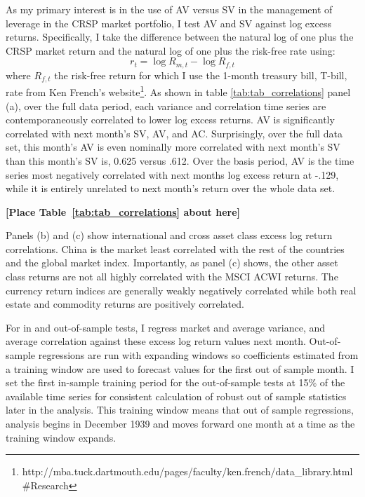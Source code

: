 As my primary interest is in the use of AV versus SV in the management of leverage in the CRSP market portfolio, I test AV and SV against log excess returns.
Specifically, I take the difference between the natural log of one plus the CRSP market return and the natural log of one plus the risk-free rate using:
\begin{equation}
	r_{t} = \log R_{m,t} - \log R_{f,t} 
\end{equation}
where $R_{f,t}$ the risk-free return for which I use the 1-month treasury bill, T-bill, rate from Ken French's website\footnote{http://mba.tuck.dartmouth.edu/pages/faculty/ken.french/data\_library.html\#Research}. As shown in table \ref{tab:tab_correlations} panel (a), over the full data period, each variance and correlation time series are contemporaneously correlated to lower log excess returns. AV is significantly correlated with next month's SV, AV, and AC. Surprisingly, over the full data set, this month's AV is even nominally more correlated with next month's SV than this month's SV is, 0.625 versus .612. Over the basis period, AV is the time series most negatively correlated with next months log excess return at -.129, while it is entirely unrelated to next month's return over the whole data set.
\bigskip
\centerline{\bf [Place Table~\ref{tab:tab_correlations} about here]}
\bigskip

Panels (b) and (c) show international and cross asset class excess log return correlations. China is the market least correlated with the rest of the countries and the global market index. Importantly, as panel (c) shows, the other asset class returns are not all highly correlated with the MSCI ACWI returns. The currency return indices are generally weakly negatively correlated while both real estate and commodity returns are positively correlated.

For in and out-of-sample tests, I regress market and average variance, and average correlation against these excess log return values next month. Out-of-sample regressions are run with expanding windows so coefficients estimated from a training window are used to forecast values for the first out of sample month. I set the first in-sample training period for the out-of-sample tests at 15\% of the available time series for consistent calculation of robust out of sample statistics later in the analysis. This training window means that out of sample regressions, analysis begins in December 1939 and moves forward one month at a time as the training window expands.

